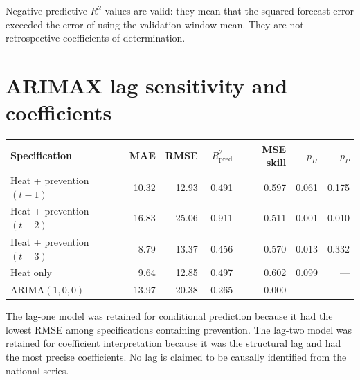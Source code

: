 \documentclass[10pt,a4paper]{article}
\begin{document}
Negative predictive $R^2$ values are valid: they mean that the squared forecast error exceeded the error of using the validation-window mean. They are not retrospective coefficients of determination.

\section{ARIMAX lag sensitivity and coefficients}
\begin{table}[H]\centering\small
\begin{tabular}{lrrrrrr}
\toprule
Specification & MAE & RMSE & $R^2_{\mathrm{pred}}$ & MSE skill & $p_H$ & $p_P$ \\
\midrule
Heat + prevention $(t-1)$ & 10.32 & 12.93 & 0.491 & 0.597 & 0.061 & 0.175 \\
Heat + prevention $(t-2)$ & 16.83 & 25.06 & -0.911 & -0.511 & 0.001 & 0.010 \\
Heat + prevention $(t-3)$ & 8.79 & 13.37 & 0.456 & 0.570 & 0.013 & 0.332 \\
Heat only & 9.64 & 12.85 & 0.497 & 0.602 & 0.099 & --- \\
ARIMA$(1,0,0)$ & 13.97 & 20.38 & -0.265 & 0.000 & --- & --- \\
\bottomrule
\end{tabular}
\end{table}

The lag-one model was retained for conditional prediction because it had the lowest RMSE among specifications containing prevention. The lag-two model was retained for coefficient interpretation because it was the structural lag and had the most precise coefficients. No lag is claimed to be causally identified from the national series.
\end{document}
